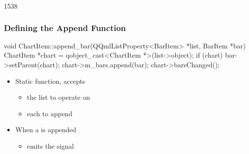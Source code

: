 \begin{slide}[fragile]{1538}\frametitle{Defining the Append Function}

\begin{cpp}
void ChartItem::append_bar(QQmlListProperty<BarItem> *list,
                           BarItem *bar)
{
    ChartItem *chart = qobject_cast<ChartItem *>(list->object);
    if (chart) {
        bar->setParent(chart);
        chart->m_bars.append(bar);
        chart->barsChanged();
    }
}
\end{cpp}

\vspace*{0.5em}
\begin{itemize}
\item Static function, accepts
  \begin{itemize}
  \item the list to operate on
  \item each  to append
  \end{itemize}
\vspace*{0.5em}
\item When a  is appended
  \begin{itemize}
  \item emits the  signal
  \end{itemize}
\end{itemize}

\end{slide}

